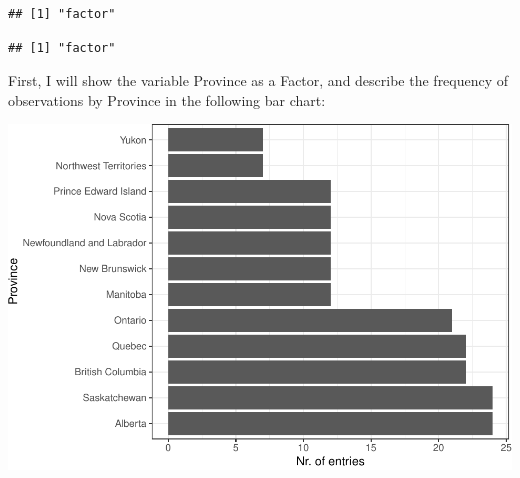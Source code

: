 \documentclass[]{article}
\newenvironment{Shaded}{\begin{snugshade}}{\end{snugshade}}
\newcommand{\KeywordTok}[1]{\textcolor[rgb]{0.13,0.29,0.53}{\textbf{#1}}}
\newcommand{\NormalTok}[1]{#1}
\newcommand{\OperatorTok}[1]{\textcolor[rgb]{0.81,0.36,0.00}{\textbf{#1}}}
\newcommand{\StringTok}[1]{\textcolor[rgb]{0.31,0.60,0.02}{#1}}
\begin{document}
\begin{Shaded}
\end{Shaded}

\begin{verbatim}
## [1] "factor"
\end{verbatim}

\begin{Shaded}
\end{Shaded}

\begin{verbatim}
## [1] "factor"
\end{verbatim}

First, I will show the variable Province as a Factor, and describe the
frequency of observations by Province in the following bar chart:

\begin{Shaded}
\end{Shaded}

\includegraphics{hw05_files/figure-latex/unnamed-chunk-5-1.pdf}
\end{document}
